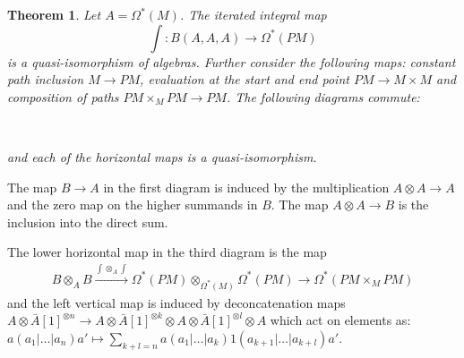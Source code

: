 \documentclass{scrartcl}
\theoremstyle{plain}
\newtheorem{theorem}{Theorem}[section]
\theoremstyle{definition}
\let\xto\xrightarrow
\begin{document}
\begin{theorem}\label{thm:path_models_1}
    Let $A=\Omega^*(M)$. The iterated integral map $$\int\colon B(A, A, A)\to \Omega^*(PM)$$ is a quasi-isomorphism of algebras. Further consider the following maps: constant path inclusion $M\to PM$, evaluation at the start and end point $PM\to M\times M$ and composition of paths $PM\times_M PM\to PM$. The following diagrams commute:

    \begin{center}
    \qquad\qquad\qquad
    \\
    \qquad
    \end{center}
    and each of the horizontal maps is a quasi-isomorphism.
\end{theorem}

The map $B\to A$ in the first diagram is induced by the multiplication $A\otimes A\to A$ and the zero map on the higher summands in $B$. The map $A\otimes A\to B$ is the inclusion into the direct sum.

The lower horizontal map in the third diagram is the map 
\begin{align*}
    B\otimes_A B\xto{\int\otimes_A\int} \Omega^*(PM)\otimes_{\Omega^*(M)}\Omega^*(PM) \to \Omega^*(PM\times_M PM)
\end{align*}
and the left vertical map is induced by deconcatenation maps $A\otimes \bar A[1]^{\otimes n} \to A\otimes \bar A[1]^{\otimes k} \otimes A \otimes \bar A[1]^{\otimes l} \otimes A$ which act on elements as: $a(a_1|\dots|a_n)a'\mapsto \sum_{k+l=n} a(a_1|\dots|a_k) 1 (a_{k+1}|\dots|a_{k+l}) a'$.
\end{document}
